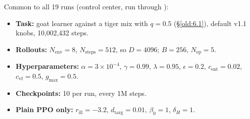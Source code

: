 Common to all 19 runs (control center, run through ):

\begin{itemize}
\item \textbf{Task:} goat learner against a tiger mix with $q = 0.5$ (\S\ref{old:6.1}), default v1.1 knobs, 10,002,432 steps.
\item \textbf{Rollouts:} $N_{\text{env}} = 8$, $N_{\text{steps}} = 512$, so $D = 4096$; $B = 256$, $N_{\text{ep}} = 5$.
\item \textbf{Hyperparameters:} $\alpha = 3\times10^{-4}$, $\gamma = 0.99$, $\lambda = 0.95$, $\epsilon = 0.2$, $c_{\text{ent}} = 0.02$, $c_{\text{vf}} = 0.5$, $g_{\max} = 0.5$.
\item \textbf{Checkpoints:} 10 per run, every 1M steps.
\item \textbf{Plain PPO only:} $r_{\text{ill}} = -3.2$, $d_{\text{targ}} = 0.01$, $\beta_0 = 1$, $\delta_H = 1$.
\end{itemize}
